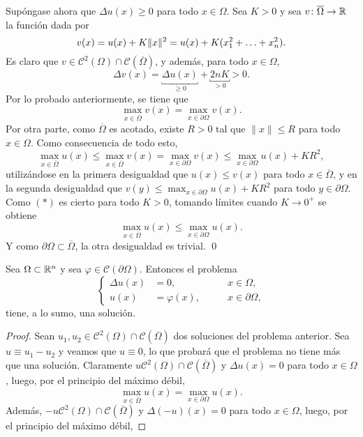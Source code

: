 \documentclass[a4paper, 12pt, extrafontsizes]{memoir}
\begin{document}
\begin{solution}
\begin{enumerate}
    Supóngase ahora que $\Delta u(x) \geq 0$ para todo $x \in \Omega$. Sea $K >0$ y sea $v \colon \overline{\Omega} \to \mathbb R$ la función dada por
    \[v(x) = u(x) + K\|x\|^2 = u(x) + K(x_1^2+\mathellipsis+x_n^2).\]
    Es claro que $v \in \mathcal{C}^2(\Omega) \cap \mathcal{C}(\overline{\Omega})$, y además, para todo $x \in \Omega$,
    \[\Delta v(x) = \underbracket{\Delta u(x)}_{\geq 0} + \underbracket{2nK}_{>0} >0.\]
    Por lo probado anteriormente, se tiene que
    \[\max_{x \in \overline{\Omega}} v(x) = \max_{x \in \partial \Omega} v(x).\]
    Por otra parte, como $\overline{\Omega}$ es acotado, existe $R>0$ tal que $\|x\| \leq R$ para todo $x \in \Omega$. Como consecuencia de todo esto,
    \[\max_{x \in \overline{\Omega}} u(x) \leq \max_{x \in \overline{\Omega}} v(x) = \max_{x \in \partial \Omega} v(x) \leq \max_{x \in \partial \Omega} u(x) + KR^2, \tag{$\ast$}\]
    utilizándose en la primera desigualdad que $u(x) \leq v(x)$ para todo $x \in \overline{\Omega}$, y en la segunda desigualdad que $v(y) \leq \max_{x \in \partial \Omega} u(x)+KR^2$ para todo $y \in \partial\Omega$. Como $(\ast)$ es cierto para todo $K > 0$, tomando límites cuando $K \to 0^+$ se obtiene
    \[\max_{x \in \overline{\Omega}}u(x) \leq \max_{x \in \partial\Omega} u(x).\]
    Y como $\partial\Omega \subset \overline{\Omega}$, la otra desigualdad es trivial. \qed
    \begin{corollary}
        Sea $\Omega \subset \mathbb R^n$ y sea $\varphi \in \mathcal{C}(\partial \Omega)$. Entonces el problema
        \[\left\{\begin{alignedat}{2}
            \Delta u(x) &= 0, \qquad &x \in \Omega, \\
            u(x) &= \varphi(x), \qquad &x \in \partial \Omega,
        \end{alignedat}\right.\]
        tiene, a lo sumo, una solución.
    \end{corollary}
    \vspace{-\baselineskip}
    \begin{proof}
        Sean $u_1,u_2 \in \mathcal{C}^2(\Omega) \cap \mathcal{C}(\overline{\Omega})$ dos soluciones del problema anterior. Sea $u \equiv u_1 - u_2$ y veamos que $u \equiv 0$, lo que probará que el problema no tiene más que una solución. Claramente $u \mathcal{C}^2(\Omega) \cap \mathcal{C}(\overline{\Omega})$ y $\Delta u(x) = 0$ para todo $x \in \Omega$, luego, por el principio del máximo débil,
        \[\max_{x \in \overline{\Omega}} u(x) = \max_{x \in \partial \Omega} u(x).\]
        Además, $-u \mathcal{C}^2(\Omega) \cap \mathcal{C}(\overline{\Omega})$ y $\Delta (-u)(x) = 0$ para todo $x \in \Omega$, luego, por el principio del máximo débil,

\end{proof}
\end{enumerate}
\end{solution}
\end{document}
